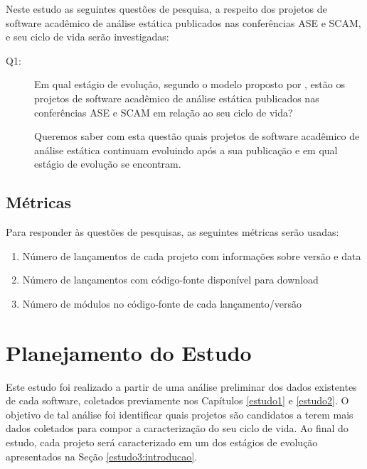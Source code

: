 Neste estudo as seguintes questões de pesquisa, a respeito dos projetos de
software acadêmico de análise estática publicados nas conferências ASE e SCAM,
e seu ciclo de vida serão investigadas:

\newcommand{\EstudoTresQuestaoUm}{
  Em qual estágio de evolução, segundo o modelo proposto por \citeonline{capiluppi2007adapting}, estão os projetos de software acadêmico de
  análise estática publicados nas conferências ASE e SCAM em relação ao seu
  ciclo de vida?
}

\begin{description}
  \item [Q1:] \EstudoTresQuestaoUm

    Queremos saber com esta questão quais projetos de software acadêmico de
    análise estática continuam evoluindo após a sua publicação e em qual estágio
    de evolução se encontram.
\end{description}

\subsection{Métricas}

Para responder às questões de pesquisas, as seguintes métricas serão usadas:

\begin{enumerate}
  \item Número de lançamentos de cada projeto com informações sobre versão e data
  \item Número de lançamentos com código-fonte disponível para download
  \item Número de módulos no código-fonte de cada lançamento/versão
\end{enumerate}


\section{Planejamento do Estudo} \label{estudo3:planejamento} %

Este estudo foi realizado a partir de uma análise preliminar dos dados existentes
de cada software, coletados previamente nos Capítulos \ref{estudo1} e
\ref{estudo2}. O objetivo de tal análise foi identificar quais projetos são candidatos a
terem mais dados coletados para compor a caracterização do seu ciclo de vida. 
Ao final do estudo, cada projeto será caracterizado em um dos estágios
de evolução apresentados na Seção \ref{estudo3:introducao}.

